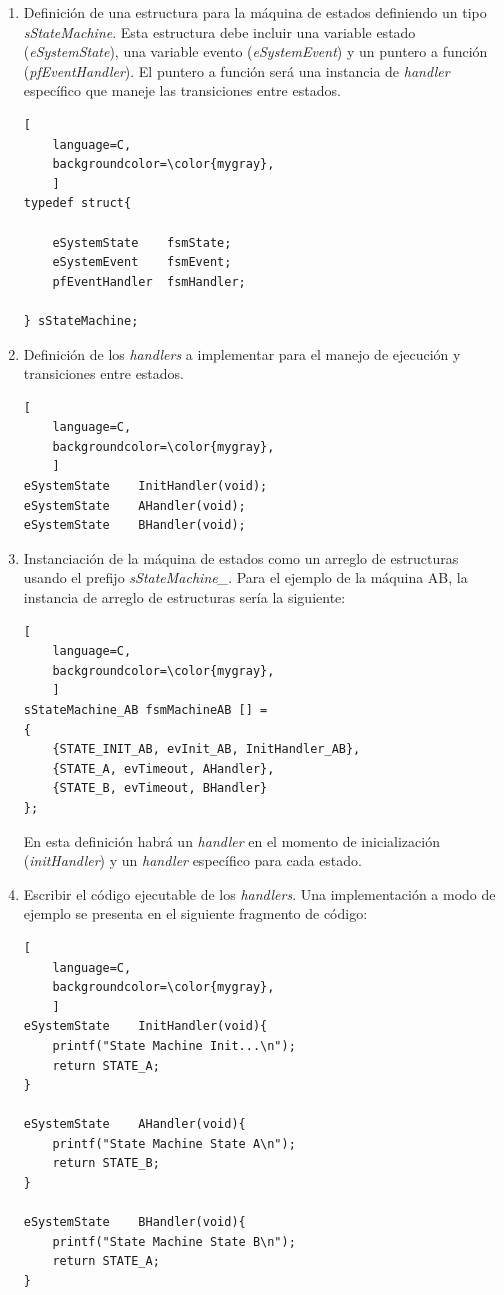 \begin{enumerate}
\begin{lstlisting}[
	language=C, 
	backgroundcolor=\color{mygray},
	]
typedef eSystemState (*pfEventHandler)(void);
\end{lstlisting}

\item Definición de una estructura para la máquina de estados definiendo un tipo \textit{sStateMachine}. Esta estructura debe incluir una variable estado (\textit{eSystemState}), una variable evento (\textit{eSystemEvent}) y un puntero a función (\textit{pfEventHandler}). El puntero a función será una instancia de \textit{handler} específico que maneje las transiciones entre estados. 

\begin{lstlisting}[
	language=C, 
	backgroundcolor=\color{mygray},
	]
typedef struct{

	eSystemState  	fsmState;
	eSystemEvent  	fsmEvent;
	pfEventHandler	fsmHandler;

} sStateMachine;
\end{lstlisting}

\item Definición de los \textit{handlers} a implementar para el manejo de ejecución y transiciones entre estados.

\begin{lstlisting}[
	language=C, 
	backgroundcolor=\color{mygray},
	]
eSystemState 	InitHandler(void);
eSystemState 	AHandler(void);
eSystemState 	BHandler(void);
\end{lstlisting}

\item Instanciación de la máquina de estados como un arreglo de estructuras usando el prefijo \textit{sStateMachine\_}. Para el ejemplo de la máquina AB, la instancia de arreglo de estructuras sería la siguiente:

\begin{lstlisting}[
	language=C, 
	backgroundcolor=\color{mygray},
	]
sStateMachine_AB fsmMachineAB [] = 
{
	{STATE_INIT_AB, evInit_AB, InitHandler_AB},
	{STATE_A, evTimeout, AHandler},
	{STATE_B, evTimeout, BHandler}
};
\end{lstlisting}

En esta definición habrá un \textit{handler} en el momento de inicialización (\textit{initHandler}) y  un \textit{handler} específico para cada estado.

\item Escribir el código ejecutable de los \textit{handlers}. Una implementación a modo de ejemplo se presenta en el siguiente fragmento de código:

\begin{lstlisting}[
	language=C, 
	backgroundcolor=\color{mygray},
	]
eSystemState 	InitHandler(void){ 
	printf("State Machine Init...\n");
	return STATE_A; 
}

eSystemState 	AHandler(void){ 
	printf("State Machine State A\n");
	return STATE_B; 
}

eSystemState 	BHandler(void){ 
	printf("State Machine State B\n");
	return STATE_A; 
}
\end{lstlisting}
\end{enumerate}


